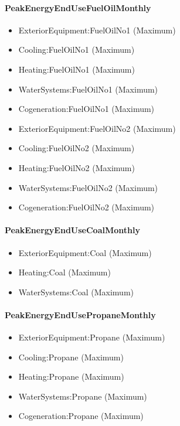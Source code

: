\paragraph{PeakEnergyEndUseFuelOilMonthly}\label{peakenergyendusefueloilmonthly}

\begin{itemize}
\item
  ExteriorEquipment:FuelOilNo1 (Maximum)
\item
  Cooling:FuelOilNo1 (Maximum)
\item
  Heating:FuelOilNo1 (Maximum)
\item
  WaterSystems:FuelOilNo1 (Maximum)
\item
  Cogeneration:FuelOilNo1 (Maximum)
\item
  ExteriorEquipment:FuelOilNo2 (Maximum)
\item
  Cooling:FuelOilNo2 (Maximum)
\item
  Heating:FuelOilNo2 (Maximum)
\item
  WaterSystems:FuelOilNo2 (Maximum)
\item
  Cogeneration:FuelOilNo2 (Maximum)
\end{itemize}

\paragraph{PeakEnergyEndUseCoalMonthly}\label{peakenergyendusecoalmonthly}

\begin{itemize}
\item
  ExteriorEquipment:Coal (Maximum)
\item
  Heating:Coal (Maximum)
\item
  WaterSystems:Coal (Maximum)
\end{itemize}

\paragraph{PeakEnergyEndUsePropaneMonthly}\label{peakenergyendusepropanemonthly}

\begin{itemize}
\item
  ExteriorEquipment:Propane (Maximum)
\item
  Cooling:Propane (Maximum)
\item
  Heating:Propane (Maximum)
\item
  WaterSystems:Propane (Maximum)
\item
  Cogeneration:Propane (Maximum)
\end{itemize}

